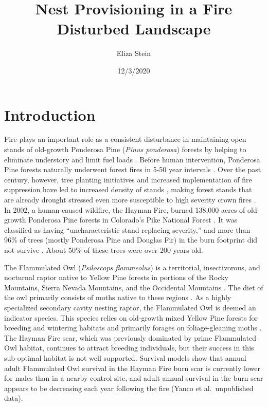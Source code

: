 \documentclass[]{article}
\title{Nest Provisioning in a Fire Disturbed Landscape}
\author{Eliza Stein}
\date{12/3/2020}
\begin{document}
\maketitle

\hypertarget{introduction}{%
\section{Introduction}\label{introduction}}

Fire plays an important role as a consistent disturbance in maintaining
open stands of old-growth Ponderosa Pine (\emph{Pinus ponderosa})
forests by helping to eliminate understory and limit fuel loads
\citep{veblen2000climatic}. Before human intervention, Ponderosa Pine
forests naturally underwent forest fires in 5-50 year intervals
\citep{veblen2000climatic}. Over the past century, however, tree
planting initiatives and increased implementation of fire suppression
have led to increased density of stands \citep{griffis2001understory},
making forest stands that are already drought stressed even more
susceptible to high severity crown fires \citep{veblen2000climatic}. In
2002, a human-caused wildfire, the Hayman Fire, burned 138,000 acres of
old-growth Ponderosa Pine forests in Colorado's Pike National Forest
\citep{graham2003hayman}. It was classified as having ``uncharacteristic
stand-replacing severity,'' and more than 96\% of trees (mostly
Ponderosa Pine and Douglas Fir) in the burn footprint did not survive
\citep{fornwalt2016did}. About 50\% of these trees were over 200 years
old.

The Flammulated Owl (\emph{Psiloscops flammeolus}) is a territorial,
insectivorous, and nocturnal raptor native to Yellow Pine forests in
portions of the Rocky Mountains, Sierra Nevada Mountains, and the
Occidental Mountains \citep{linkhart2013flammulated}. The diet of the
owl primarily consists of moths native to these regions
\citep{linkhart2013flammulated}. As a highly specialized secondary
cavity nesting raptor, the Flammulated Owl is deemed an indicator
species. This species relies on old-growth mixed Yellow Pine forests for
breeding and wintering habitats and primarily forages on
foliage-gleaning moths \citep{reynolds1992flammulated}. The Hayman Fire
scar, which was previously dominated by prime Flammulated Owl habitat,
continues to attract breeding individuals, but their success in this
sub-optimal habitat is not well supported. Survival models show that
annual adult Flammulated Owl survival in the Hayman Fire burn scar is
currently lower for males than in a nearby control site, and adult
annual survival in the burn scar appears to be decreasing each year
following the fire (Yanco et al.~unpublished data).
\end{document}
